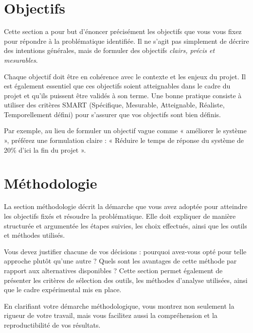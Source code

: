 \section{Objectifs}

Cette section a pour but d'énoncer précisément les objectifs que vous vous fixez pour répondre à la problématique identifiée. Il ne s'agit pas simplement de décrire des intentions générales, mais de formuler des objectifs \emph{clairs, précis et mesurables}.

Chaque objectif doit être en cohérence avec le contexte et les enjeux du projet. Il est également essentiel que ces objectifs soient atteignables dans le cadre du projet et qu'ils puissent être validés à son terme. Une bonne pratique consiste à utiliser des critères SMART (Spécifique, Mesurable, Atteignable, Réaliste, Temporellement défini) pour s'assurer que vos objectifs sont bien définis.

Par exemple, au lieu de formuler un objectif vague comme « améliorer le système », préférez une formulation claire : « Réduire le temps de réponse du système de 20\% d'ici la fin du projet ».

\section{Méthodologie}

La section méthodologie décrit la démarche que vous avez adoptée pour atteindre les objectifs fixés et résoudre la problématique. Elle doit expliquer de manière structurée et argumentée les étapes suivies, les choix effectués, ainsi que les outils et méthodes utilisés.

Vous devez justifier chacune de vos décisions : pourquoi avez-vous opté pour telle approche plutôt qu'une autre ? Quels sont les avantages de cette méthode par rapport aux alternatives disponibles ? Cette section permet également de présenter les critères de sélection des outils, les méthodes d'analyse utilisées, ainsi que le cadre expérimental mis en place.

En clarifiant votre démarche méthodologique, vous montrez non seulement la rigueur de votre travail, mais vous facilitez aussi la compréhension et la reproductibilité de vos résultats.
